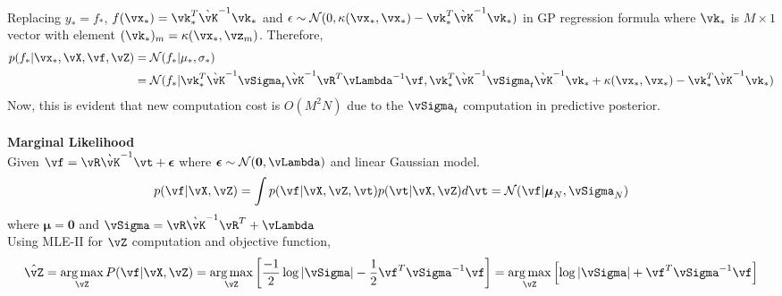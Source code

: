 \documentclass[a4paper,11pt]{article}
\begin{document}
\begin{pmisolution}
Replacing \(y_{\ast} = f_{\ast}\), \(f(\vx_{\ast}) = \vk_{\ast}^{T}\Grave{\vK}^{-1}\vk_{\ast}\) and \(\epsilon \sim \mathcal{N}(0,\kappa(\vx_{\ast},\vx_{\ast}) - \vk_{\ast}^{T}\Grave{\vK}^{-1}\vk_{\ast})\) in GP regression formula where \(\vk_{\ast}\) is \(M \times 1\) vector with element \((\vk_{\ast})_{m} = \kappa(\vx_{\ast},\vz_{m})\). Therefore,
\begin{align*}
    p(f_{\ast}|\vx_{\ast}, \vX, \vf, \vZ) &= \mathcal{N}(f_{\ast}| \mu_{\ast}, \sigma_{\ast})\\
    &= \mathcal{N}(f_{\ast}| \vk_{\ast}^{T}\Grave{\vK}^{-1}\vSigma_{t}\Grave{\vK}^{-1}\vR^{T}\vLambda^{-1}\vf, \vk_{\ast}^{T}\Grave{\vK}^{-1}\vSigma_{t}\Grave{\vK}^{-1}\vk_{\ast} + \kappa(\vx_{\ast},\vx_{\ast}) - \vk_{\ast}^{T}\Grave{\vK}^{-1}\vk_{\ast})\\
\end{align*}
Now, this is evident that new computation cost is \(O(M^2N)\) due to the \(\vSigma_{t}\) computation in predictive posterior.\\\\
\textbf{Marginal Likelihood}\\
Given \(\vf = \vR\Grave{\vK}^{-1}\vt + \boldsymbol \epsilon\) where \(\boldsymbol \epsilon \sim \mathcal{N}(\boldsymbol 0,\vLambda)\) and linear Gaussian model.\\
\[p(\vf|\vX,\vZ) = \int p(\vf|\vX,\vZ,\vt)p(\vt|\vX,\vZ)d\vt = \mathcal{N}(\vf|\boldsymbol \mu_N,\vSigma_N)\]
where \(\boldsymbol \mu = \boldsymbol 0\) and \(\vSigma = \vR\Grave{\vK}^{-1}\vR^{T} + \vLambda\)\\
Using MLE-II for $\vZ$ computation and objective function,
\[\hat{\vZ} = \argmax_{\vZ}P(\vf|\vX,\vZ) = \argmax_{\vZ}\left[\frac{-1}{2}\log|\vSigma| - \frac{1}{2}\vf^{T}\vSigma^{-1}\vf\right] = \argmax_{\vZ}\left[\log|\vSigma| + \vf^{T}\vSigma^{-1}\vf \right]\]
\end{pmisolution}
\end{document}
